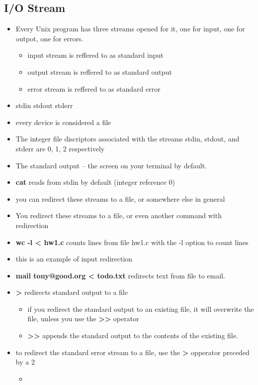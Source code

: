 \documentclass{article}
\begin{document}
\subsection*{I/O Stream}
\begin{itemize}
  \item Every Unix program has three streams opened for it, one for input, one for outpot, one for errors.
  \begin{itemize}
    \item input stream is reffered to as standard input
    \item output stream is reffered to as standard output
    \item error stream is reffered to as standard error
  \end{itemize}
  \item stdin stdout stderr
  \item every device is considered a file
  \item The integer file discriptors associated with the streams stdin, stdout, and stderr are 0, 1, 2 respectively
  \item The standard output -- the screen on your terminal by default.
  \item \textbf{cat} reads from stdin by default (integer reference 0)
  \item you can redirect these streams to a file, or somewhere else in general
  \item You redirect these streams to a file, or even another command with redirection
  \item \textbf{wc -l < hw1.c} counts lines from file hw1.c with the -l option to count lines
  \item this is an example of input redirection
  \item \textbf{mail tony@good.org < todo.txt} redirects text from file to email.
  \item \textbf{>} redirects standard output to a file
  \begin{itemize}
    \item if you redirect the standard output to an existing file, it will overwrite the file, unless you use the \textbf{>>} operator
    \item \textbf{>>} appends the standard output to the contents of the existing file.
  \end{itemize}
  \item to redirect the standard error stream to a file, use the \textbf{>} opperator preceded by a 2
  \begin{itemize}
    \item 
  \end{itemize}
\end{itemize}
\end{document}
